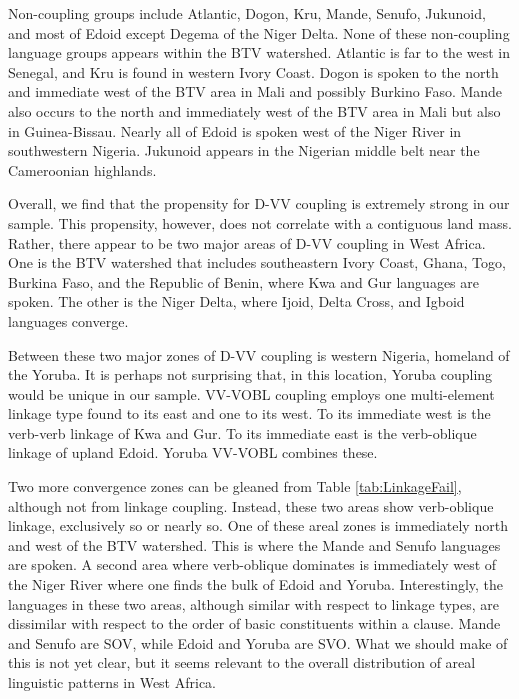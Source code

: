 \documentclass[output=paper,colorlinks,citecolor=brown]{langscibook}
\begin{document}
Non-coupling groups include Atlantic, Dogon, Kru, Mande, Senufo, Jukunoid, and most of Edoid except Degema of the Niger Delta. None of these non-coupling language groups appears within the BTV watershed. Atlantic is far to the west in Senegal, and Kru is found in western Ivory Coast. Dogon is spoken to the north and immediate west of the BTV area in Mali and possibly Burkino Faso. Mande also occurs to the north and immediately west of the BTV area in Mali but also in Guinea-Bissau. Nearly all of Edoid is spoken west of the Niger River in southwestern Nigeria. Jukunoid appears in the Nigerian middle belt near the Cameroonian highlands.

Overall, we find that the propensity for D-VV coupling is extremely strong in our sample. This propensity, however, does not correlate with a contiguous land mass. Rather, there appear to be two major areas of D-VV coupling in West Africa. One is the BTV watershed that includes southeastern Ivory Coast, Ghana, Togo, Burkina Faso, and the Republic of Benin, where Kwa and Gur languages are spoken. The other is the Niger Delta, where Ijoid, Delta Cross, and Igboid languages converge.

Between these two major zones of D-VV coupling is western Nigeria, homeland of the Yoruba. It is perhaps not surprising that, in this location, Yoruba coupling would be unique in our sample.  VV-VOBL coupling employs one multi-element linkage type found to its east and one to its west. To its immediate west is the verb-verb linkage of Kwa and Gur. To its immediate east is the verb-oblique linkage of upland Edoid. Yoruba VV-VOBL combines these.

Two more  convergence zones can be gleaned from Table \ref{tab:LinkageFail}, although not from linkage coupling. Instead, these two areas show verb-oblique linkage, exclusively so or nearly so. One of these areal zones is immediately north and west of the BTV watershed. This is where the Mande and Senufo languages are spoken. A second area where verb-oblique dominates is immediately west of the Niger River where one finds the bulk of  Edoid and Yoruba. Interestingly, the languages in these two areas, although similar with respect to linkage types, are dissimilar with respect to the order of basic constituents within a clause. Mande and Senufo are SOV, while Edoid and Yoruba are SVO. What we should make of this is not yet clear, but it seems relevant to the overall distribution of areal linguistic patterns in West Africa.
\end{document}
